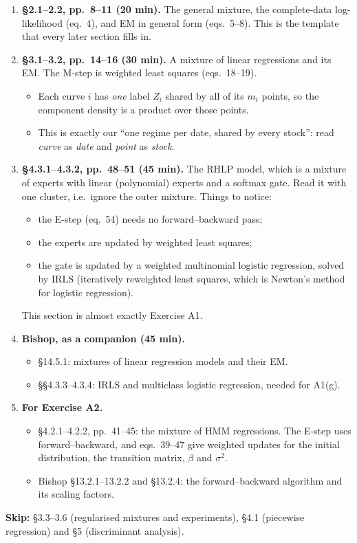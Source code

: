 \begin{enumerate}[label=\textbf{R\arabic*.}]
\item \textbf{\S2.1--2.2, pp.\ 8--11 (20 min).} The general mixture, the complete-data log-likelihood (eq.~4), and EM in general form (eqs.~5--8). This is the template that every later section fills in.
\item \textbf{\S3.1--3.2, pp.\ 14--16 (30 min).} A mixture of linear regressions and its EM. The M-step is weighted least squares (eqs.~18--19).
  \begin{itemize}
    \item Each curve $i$ has \emph{one} label $Z_i$ shared by all of its $m_i$ points, so the component density is a product over those points.
    \item This is exactly our ``one regime per date, shared by every stock'': read \emph{curve} as \emph{date} and \emph{point} as \emph{stock}.
  \end{itemize}
\item \textbf{\S4.3.1--4.3.2, pp.\ 48--51 (45 min).} The RHLP model, which is a mixture of experts with linear (polynomial) experts and a softmax gate. Read it with one cluster, i.e.\ ignore the outer mixture. Things to notice:
  \begin{itemize}
    \item the E-step (eq.~54) needs no forward--backward pass;
    \item the experts are updated by weighted least squares;
    \item the gate is updated by a weighted multinomial logistic regression, solved by IRLS (iteratively reweighted least squares, which is Newton's method for logistic regression).
  \end{itemize}
  This section is almost exactly Exercise A1.
\item \textbf{Bishop, as a companion (45 min).}
  \begin{itemize}
    \item \S14.5.1: mixtures of linear regression models and their EM.
    \item \S\S4.3.3--4.3.4: IRLS and multiclass logistic regression, needed for A1(g).
  \end{itemize}
\item \textbf{For Exercise A2.}
  \begin{itemize}
    \item \S4.2.1--4.2.2, pp.\ 41--45: the mixture of HMM regressions. The E-step uses forward--backward, and eqs.~39--47 give weighted updates for the initial distribution, the transition matrix, $\beta$ and $\sigma^2$.
    \item Bishop \S13.2.1--13.2.2 and \S13.2.4: the forward--backward algorithm and its scaling factors.
  \end{itemize}
\end{enumerate}
\textbf{Skip:} \S3.3--3.6 (regularised mixtures and experiments), \S4.1 (piecewise regression) and \S5 (discriminant analysis).

